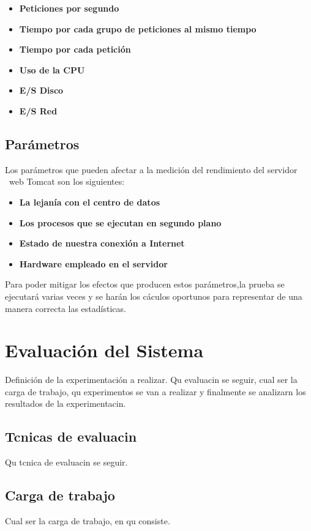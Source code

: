 \documentclass[11pt,twoside,a4paper]{book}
\begin{document}
\begin{itemize}
  \item \textbf{Peticiones por segundo}
  \item \textbf{Tiempo por cada grupo de peticiones al mismo tiempo}
  \item \textbf{Tiempo por cada petición}
  \item \textbf{Uso de la CPU}
  \item \textbf{E/S Disco}
  \item \textbf{E/S Red}
\end{itemize}

\pagebreak
\section{Parámetros}
Los parámetros que pueden afectar a la medición del rendimiento del servidor \
web Tomcat son los siguientes:

\begin{itemize}
  \item \textbf{La lejanía con el centro de datos}
  \item \textbf{Los procesos que se ejecutan en segundo plano}
  \item \textbf{Estado de nuestra conexión a Internet}
  \item \textbf{Hardware empleado en el servidor}
\end{itemize}

Para poder mitigar los efectos que producen estos parámetros,la prueba se ejecutará varias veces y se harán los cáculos oportunos para representar de una manera correcta las estadísticas.

\chapter{Evaluación del Sistema}
Definición de la experimentación a realizar. Qu evaluacin se seguir, cual ser la carga de trabajo, qu experimentos se van a realizar y finalmente se analizarn los resultados de la experimentacin.

\section{Tcnicas de evaluacin}
Qu tcnica de evaluacin se seguir.

\section{Carga de trabajo}
Cual ser la carga de trabajo, en qu consiste.
\end{document}
